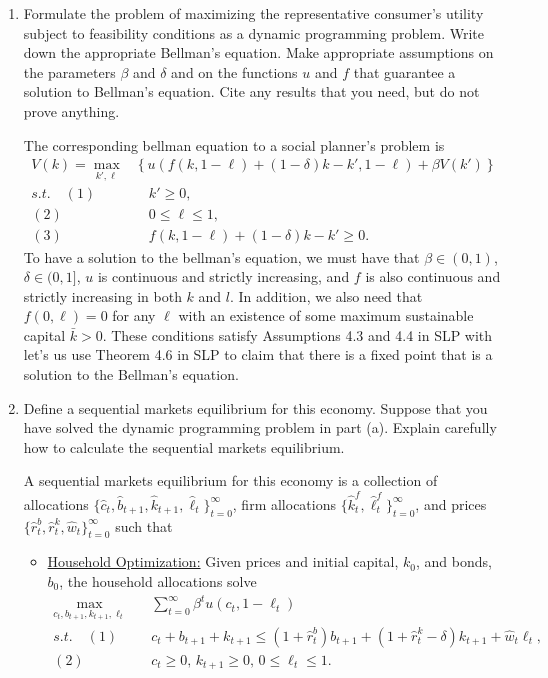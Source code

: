 \documentclass[11pt,english]{article}
\begin{document}
\begin{enumerate}
    \item[(a)] Formulate the problem of maximizing the representative consumer's
        utility subject to feasibility conditions as a dynamic programming
        problem. Write down the appropriate Bellman's equation. Make appropriate
        assumptions on the parameters $\beta$ and $\delta$ and on the functions
        $u$ and $f$ that guarantee a solution to Bellman's equation. Cite any
        results that you need, but do not prove anything.
    \begin{solution}
 The corresponding bellman equation to a social planner's problem is
\begin{align*}
V(k) = \max_{k', \ell}&\left\{u(f(k, 1-\ell) + (1 - \delta)k - k', 1 - \ell) + \beta V(k')\right\}\\
s.t.\quad (1)&\quad k' \geq 0,\\
(2)&\quad 0 \leq \ell \leq 1,\\
(3)&\quad f(k, 1-\ell) + (1 - \delta)k - k' \geq 0.
\end{align*}
To have a solution to the bellman's equation, we must have that $\beta \in (0,1)$, $\delta\in (0,1]$, $u$ is continuous and strictly increasing, and $f$ is also continuous and strictly increasing in both $k$ and $l$. In addition, we also need that $f(0,\ell) = 0$ for any $\ell$ with an existence of some maximum sustainable capital $\bar{k} > 0$. These conditions satisfy Assumptions 4.3 and 4.4 in SLP with let's us use Theorem 4.6 in SLP to claim that there is a fixed point that is a solution to the Bellman's equation.
    \end{solution}
 
    \item[(b)] Define a sequential markets equilibrium for this economy. Suppose
        that you have solved the dynamic programming problem in part (a). Explain
        carefully how to calculate the sequential markets equilibrium.
    \begin{solution}
 A sequential markets equilibrium for this economy is a collection of allocations $\{\hat{c}_t, \hat{b}_{t+1}, \hat{k}_{t+1}, \hat{\ell}_t\}_{t=0}^\infty$, firm allocations $\{\hat{k}_t^f, \hat{\ell}_t^f\}_{t=0}^\infty$, and prices $\{\hat{r}^b_t, \hat{r}^k_t, \hat{w}_t\}_{t=0}^\infty$ such that 
\begin{itemize}
\item \underline{Household Optimization:} Given prices and initial capital, $k_0$, and bonds, $b_0$, the household allocations solve
\begin{align*}
\max_{c_t, b_{t+1}, k_{t+1}, \ell_t}&\quad \sum_{t=0}^\infty \beta^t u(c_t, 1 - \ell_t)\\
s.t.\quad (1)&\quad c_t + b_{t+1} + k_{t+1} \leq (1 + \hat{r}^b_t)b_{t+1} + (1 + \hat{r}^k_t - \delta)k_{t+1} + \hat{w}_t\ell_t,\\
(2)&\quad c_t \geq 0,\, k_{t+1} \geq 0,\, 0 \leq \ell_t \leq 1.
\end{align*}


\end{itemize}
\end{solution}
\end{enumerate}
\end{document}
